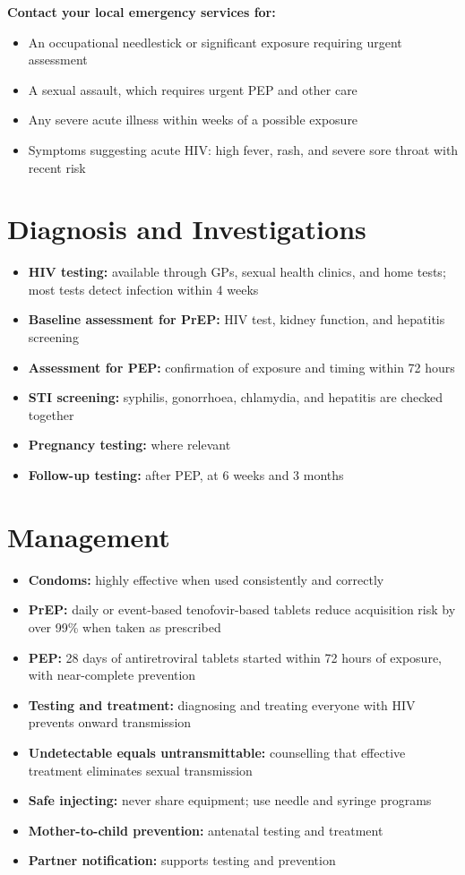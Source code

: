 \textbf{Contact your local emergency services for:}
\begin{itemize}
    \item An occupational needlestick or significant exposure requiring urgent assessment
    \item A sexual assault, which requires urgent PEP and other care
    \item Any severe acute illness within weeks of a possible exposure
    \item Symptoms suggesting acute HIV: high fever, rash, and severe sore throat with recent risk
\end{itemize}

\section*{Diagnosis and Investigations}
\begin{itemize}
    \item \textbf{HIV testing:} available through GPs, sexual health clinics, and home tests; most tests detect infection within 4 weeks
    \item \textbf{Baseline assessment for PrEP:} HIV test, kidney function, and hepatitis screening
    \item \textbf{Assessment for PEP:} confirmation of exposure and timing within 72 hours
    \item \textbf{STI screening:} syphilis, gonorrhoea, chlamydia, and hepatitis are checked together
    \item \textbf{Pregnancy testing:} where relevant
    \item \textbf{Follow-up testing:} after PEP, at 6 weeks and 3 months
\end{itemize}

\section*{Management}
\begin{itemize}
    \item \textbf{Condoms:} highly effective when used consistently and correctly
    \item \textbf{PrEP:} daily or event-based tenofovir-based tablets reduce acquisition risk by over 99\% when taken as prescribed
    \item \textbf{PEP:} 28 days of antiretroviral tablets started within 72 hours of exposure, with near-complete prevention
    \item \textbf{Testing and treatment:} diagnosing and treating everyone with HIV prevents onward transmission
    \item \textbf{Undetectable equals untransmittable:} counselling that effective treatment eliminates sexual transmission
    \item \textbf{Safe injecting:} never share equipment; use needle and syringe programs
    \item \textbf{Mother-to-child prevention:} antenatal testing and treatment
    \item \textbf{Partner notification:} supports testing and prevention
\end{itemize}

